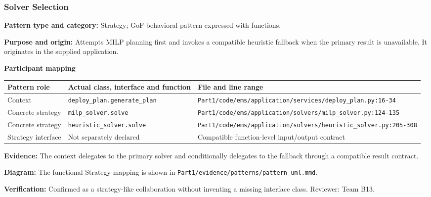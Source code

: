 \documentclass[11pt,a4paper]{article}
\newcommand{\entry}[2]{\textbf{#1:} #2\par}
\newcommand{\codepath}[1]{\nolinkurl{#1}}
\begin{document}
\subsubsection{Solver Selection}
\entry{Pattern type and category}{Strategy; GoF behavioral pattern expressed with functions.}
\entry{Purpose and origin}{Attempts MILP planning first and invokes a compatible heuristic fallback when the primary result is unavailable. It originates in the supplied application.}
\textbf{Participant mapping}\par
\begin{tabularx}{\linewidth}{@{}lXX@{}}
\toprule
Pattern role & Actual class, interface and function & File and line range\\
\midrule
Context & \codepath{deploy_plan.generate_plan} & \codepath{Part1/code/ems/application/services/deploy_plan.py:16-34}\\
Concrete strategy & \codepath{milp_solver.solve} & \codepath{Part1/code/ems/application/solvers/milp_solver.py:124-135}\\
Concrete strategy & \codepath{heuristic_solver.solve} & \codepath{Part1/code/ems/application/solvers/heuristic_solver.py:205-308}\\
Strategy interface & Not separately declared & Compatible function-level input/output contract\\
\bottomrule
\end{tabularx}
\entry{Evidence}{The context delegates to the primary solver and conditionally delegates to the fallback through a compatible result contract.}
\entry{Diagram}{The functional Strategy mapping is shown in \codepath{Part1/evidence/patterns/pattern_uml.mmd}.}
\entry{Verification}{Confirmed as a strategy-like collaboration without inventing a missing interface class. Reviewer: Team B13.}
\end{document}
